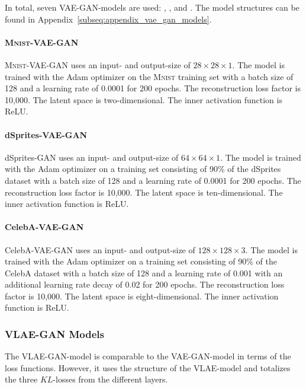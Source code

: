In total, seven \ac{VAE}-\ac{GAN}-models are used: , , and .
The model structures can be found in Appendix~\ref{subseq:appendix_vae_gan_models}.

\paragraph{\textsc{Mnist}-\ac{VAE}-\ac{GAN}} \textsc{Mnist}-\ac{VAE}-\ac{GAN} uses an input- and output-size of $28\times 28\times 1$.
The model is trained with the Adam optimizer on the \textsc{Mnist} training set with a batch size of 128 and a learning rate of 0.0001 for 200 epochs.
The reconstruction loss factor is 10,000.
The latent space is two-dimensional.
The inner activation function is ReLU.

\paragraph{dSprites-\ac{VAE}-\ac{GAN}} dSprites-\ac{GAN} uses an input- and output-size of $64\times 64\times 1$.
The model is trained with the Adam optimizer on a training set consisting of 90\% of the dSprites dataset with a batch size of 128 and a learning rate of 0.0001 for 200 epochs.
The reconstruction loss factor is 10,000.
The latent space is ten-dimensional.
The inner activation function is ReLU.

\paragraph{CelebA-\ac{VAE}-\ac{GAN}} CelebA-\ac{VAE}-\ac{GAN} uses an input- and output-size of $128\times 128\times 3$.
The model is trained with the Adam optimizer on a training set consisting of 90\% of the CelebA dataset with a batch size of 128 and a learning rate of 0.001 with an additional learning rate decay of 0.02 for 200 epochs.
The reconstruction loss factor is 10,000.
The latent space is eight-dimensional.
The inner activation function is ReLU.

\subsubsection{VLAE-GAN Models}\label{subsubsec:vlae_gan_models}

The \ac{VLAE}-\ac{GAN}-model is comparable to the \ac{VAE}-\ac{GAN}-model in terms of the loss functions.
However, it uses the structure of the \ac{VLAE}-model and totalizes the three $KL$-losses from the different layers.

